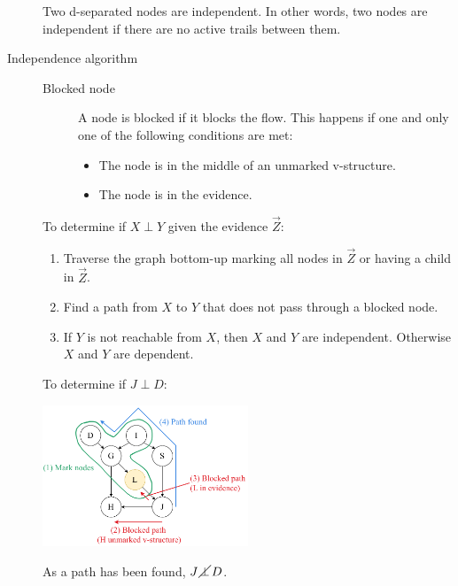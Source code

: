 \begin{description}
        \begin{theorem}
            Two d-separated nodes are independent.
            In other words, two nodes are independent if there are no active trails between them.
        \end{theorem}

    \item[Independence algorithm] \phantom{}
        \begin{description}
            \item[Blocked node]
                A node is blocked if it blocks the flow.
                This happens if one and only one of the following conditions are met:
                \begin{itemize}
                    \item The node is in the middle of an unmarked v-structure.
                    \item The node is in the evidence.
                \end{itemize}
        \end{description}
        To determine if $X \perp Y$ given the evidence $\vec{Z}$:
        \begin{enumerate}
            \item Traverse the graph bottom-up marking all nodes in $\vec{Z}$ or
                having a child in $\vec{Z}$.
            \item Find a path from $X$ to $Y$ that does not pass through a blocked node.
            \item If $Y$ is not reachable from $X$, then $X$ and $Y$ are independent.
                Otherwise $X$ and $Y$ are dependent.
        \end{enumerate}

        \begin{example}
            To determine if $J \perp D$:
            \begin{center}
                \includegraphics[width=0.5\textwidth]{img/_d_sep_example.pdf}
            \end{center}
            As a path has been found, $J \,\cancel{\perp}\, D$.
        \end{example}
    


\end{description}
